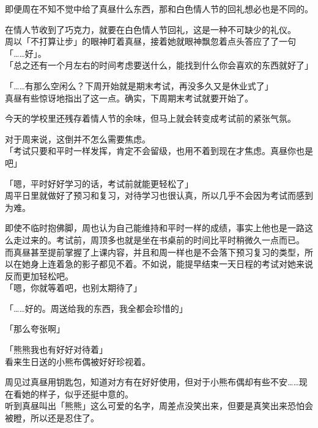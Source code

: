 即便周在不知不觉中给了真昼什么东西，那和白色情人节的回礼想必也是不同的。

在情人节收到了巧克力，就要在白色情人节回礼，这是一种不可缺少的礼仪。\\

周以「不打算让步」的眼神盯着真昼，接着她就眼神飘忽着点头答应了了一句「……好」。\\

「总之还有一个月左右的时间考虑要送什么，能找到什么你会喜欢的东西就好了」

「……有那么空闲么？下周开始就是期末考试，再没多久又是休业式了」\\

真昼有些惊讶地指出了这一点。确实，下周期末考试就要开始了。

今天的学校里还残存着情人节的余味，但马上就会转变成考试前的紧张气氛。

对于周来说，这倒并不怎么需要焦虑。\\

「考试只要和平时一样发挥，肯定不会留级，也用不着到现在才焦虑。真昼你也是吧」

「嗯，平时好好学习的话，考试前就能更轻松了」\\

周平日里就做好了预习和复习，对待学习也很认真，所以几乎不会因为考试而感到为难。

即使不临时抱佛脚，周也认为自己能维持和平时一样的成绩，事实上他也是一路这么走过来的。考试前，周顶多也就是坐在书桌前的时间比平时稍微久一点而已。\\

而真昼甚至提前掌握了上课内容，并且和周一样也是不会落下预习复习的类型，所以在她身上连着急的影子都见不着。不如说，能提早结束一天日程的考试对她来说反而更加轻松吧。\\

「嗯，你就等着吧，也别太期待了」

「……好的。周送给我的东西，我全都会珍惜的」

「那么夸张啊」

「熊熊我也有好好对待着」\\

看来生日送的小熊布偶被好好珍视着。

周见过真昼用钥匙包，知道对方有在好好使用，但对于小熊布偶却有些不安……现在看她的样子，似乎还挺中意的。\\

听到真昼叫出「熊熊」这么可爱的名字，周差点没笑出来，但要是真笑出来恐怕会被瞪，所以还是忍住了。\\

